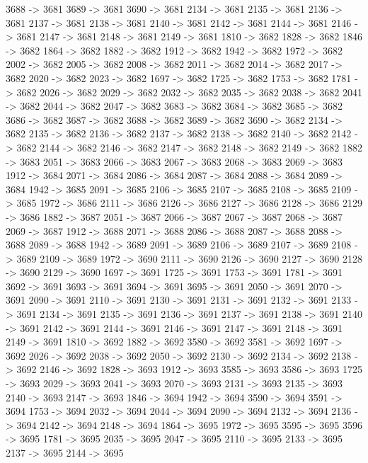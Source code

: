 {	3688 -> 3681
	3689 -> 3681
	3690 -> 3681
	2134 -> 3681
	2135 -> 3681
	2136 -> 3681
	2137 -> 3681
	2138 -> 3681
	2140 -> 3681
	2142 -> 3681
	2144 -> 3681
	2146 -> 3681
	2147 -> 3681
	2148 -> 3681
	2149 -> 3681
	1810 -> 3682
	1828 -> 3682
	1846 -> 3682
	1864 -> 3682
	1882 -> 3682
	1912 -> 3682
	1942 -> 3682
	1972 -> 3682
	2002 -> 3682
	2005 -> 3682
	2008 -> 3682
	2011 -> 3682
	2014 -> 3682
	2017 -> 3682
	2020 -> 3682
	2023 -> 3682
	1697 -> 3682
	1725 -> 3682
	1753 -> 3682
	1781 -> 3682
	2026 -> 3682
	2029 -> 3682
	2032 -> 3682
	2035 -> 3682
	2038 -> 3682
	2041 -> 3682
	2044 -> 3682
	2047 -> 3682
	3683 -> 3682
	3684 -> 3682
	3685 -> 3682
	3686 -> 3682
	3687 -> 3682
	3688 -> 3682
	3689 -> 3682
	3690 -> 3682
	2134 -> 3682
	2135 -> 3682
	2136 -> 3682
	2137 -> 3682
	2138 -> 3682
	2140 -> 3682
	2142 -> 3682
	2144 -> 3682
	2146 -> 3682
	2147 -> 3682
	2148 -> 3682
	2149 -> 3682
	1882 -> 3683
	2051 -> 3683
	2066 -> 3683
	2067 -> 3683
	2068 -> 3683
	2069 -> 3683
	1912 -> 3684
	2071 -> 3684
	2086 -> 3684
	2087 -> 3684
	2088 -> 3684
	2089 -> 3684
	1942 -> 3685
	2091 -> 3685
	2106 -> 3685
	2107 -> 3685
	2108 -> 3685
	2109 -> 3685
	1972 -> 3686
	2111 -> 3686
	2126 -> 3686
	2127 -> 3686
	2128 -> 3686
	2129 -> 3686
	1882 -> 3687
	2051 -> 3687
	2066 -> 3687
	2067 -> 3687
	2068 -> 3687
	2069 -> 3687
	1912 -> 3688
	2071 -> 3688
	2086 -> 3688
	2087 -> 3688
	2088 -> 3688
	2089 -> 3688
	1942 -> 3689
	2091 -> 3689
	2106 -> 3689
	2107 -> 3689
	2108 -> 3689
	2109 -> 3689
	1972 -> 3690
	2111 -> 3690
	2126 -> 3690
	2127 -> 3690
	2128 -> 3690
	2129 -> 3690
	1697 -> 3691
	1725 -> 3691
	1753 -> 3691
	1781 -> 3691
	3692 -> 3691
	3693 -> 3691
	3694 -> 3691
	3695 -> 3691
	2050 -> 3691
	2070 -> 3691
	2090 -> 3691
	2110 -> 3691
	2130 -> 3691
	2131 -> 3691
	2132 -> 3691
	2133 -> 3691
	2134 -> 3691
	2135 -> 3691
	2136 -> 3691
	2137 -> 3691
	2138 -> 3691
	2140 -> 3691
	2142 -> 3691
	2144 -> 3691
	2146 -> 3691
	2147 -> 3691
	2148 -> 3691
	2149 -> 3691
	1810 -> 3692
	1882 -> 3692
	3580 -> 3692
	3581 -> 3692
	1697 -> 3692
	2026 -> 3692
	2038 -> 3692
	2050 -> 3692
	2130 -> 3692
	2134 -> 3692
	2138 -> 3692
	2146 -> 3692
	1828 -> 3693
	1912 -> 3693
	3585 -> 3693
	3586 -> 3693
	1725 -> 3693
	2029 -> 3693
	2041 -> 3693
	2070 -> 3693
	2131 -> 3693
	2135 -> 3693
	2140 -> 3693
	2147 -> 3693
	1846 -> 3694
	1942 -> 3694
	3590 -> 3694
	3591 -> 3694
	1753 -> 3694
	2032 -> 3694
	2044 -> 3694
	2090 -> 3694
	2132 -> 3694
	2136 -> 3694
	2142 -> 3694
	2148 -> 3694
	1864 -> 3695
	1972 -> 3695
	3595 -> 3695
	3596 -> 3695
	1781 -> 3695
	2035 -> 3695
	2047 -> 3695
	2110 -> 3695
	2133 -> 3695
	2137 -> 3695
	2144 -> 3695
}
